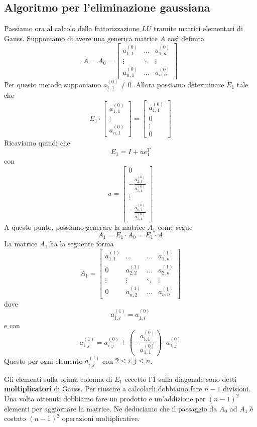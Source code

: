 \subsection{Algoritmo per l'eliminazione gaussiana}
Passiamo ora al calcolo della fattorizzazione $LU$ tramite matrici elementari di Gauss. Supponiamo di avere una
generica matrice $A$ così definita
\[
	A = A_0 = \begin{bmatrix}
		a_{1,1}^{(0)} & \dots  & a_{1,n}^{(0)} \\
		\vdots        & \ddots & \vdots        \\
		a_{n,1}^{(0)} & \dots  & a_{n,n}^{(0)}
	\end{bmatrix}
\]
Per questo metodo supponiamo $a_{1,1}^{(0)} \neq 0$. Allora possiamo determinare $E_1$ tale che
\[
	E_1 \cdot \begin{bmatrix}
		a_{1,1}^{(0)} \\ \vdots \\ a_{n,1}^{(0)}
	\end{bmatrix} =
	\begin{bmatrix}
		a_{1,1}^{(0)} \\ 0 \\ \vdots \\ 0
	\end{bmatrix}
\]
Ricaviamo quindi che
\[ E_1 = I + u e_1^T \]
con
\[
	u = \begin{bmatrix}
		0 \\ -\frac{a_{2,1}^{(0)}}{a_{1,1}^{(0)}} \\ \vdots \\ -\frac{a_{n,1}^{(0)}}{a_{1,1}^{(0)}}
	\end{bmatrix}
\]
A questo punto, possiamo generare la matrice $A_1$ come segue
\[ A_1 = E_1 \cdot A_0 = E_1 \cdot A \]
La matrice $A_1$ ha la seguente forma
\[
	A_1 = \begin{bmatrix}
		a_{1,1}^{(1)} & \dots         & \dots  & a_{1,n}^{(1)} \\
		0             & a_{2,2}^{(1)} & \dots  & a_{2,n}^{(1)} \\
		\vdots        & \vdots        & \ddots & \vdots        \\
		0             & a_{n,2}^{(1)} & \dots  & a_{n,n}^{(1)}
	\end{bmatrix}
\]
dove
\[ a_{1,i}^{(1)} = a_{1,i}^{(0)} \]
e con
\[ a_{i,j}^{(1)} = a_{i,j}^{(0)} + \left( -\frac{a_{i,1}^{(0)}}{a_{1,1}^{(0)}} \right) \cdot a_{1,j}^{(0)} \]
Questo per ogni elemento $a_{i,j}^{(1)}$ con $2 \leq i,j \leq n$.

Gli elementi sulla prima colonna di $E_1$ eccetto l'1 sulla diagonale sono detti \textbf{moltiplicatori} di
Gauss. Per riuscire a calcolarli dobbiamo fare $n-1$ divisioni. Una volta ottenuti dobbiamo fare un prodotto
e un'addizione per $(n-1)^2$ elementi per aggiornare la matrice. Ne deduciamo che il passaggio da $A_0$ ad $A_1$
è costato $(n-1)^2$ operazioni moltiplicative.

